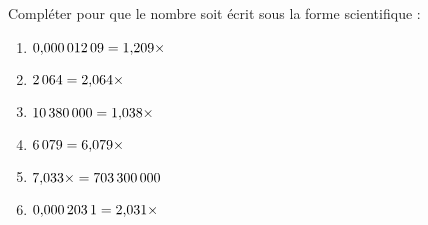 \begin{minipage}{0.99\linewidth}

\exo


Compléter pour que le nombre soit écrit sous la forme scientifique :
 
\begin{multicols}{3}

    \noindent

\begin{enumerate}

    \item $0{,}000\,012\,09=1{,}209\times\dotfill$

    \item $2\,064=2{,}064\times\dotfill$

    \item $10\,380\,000=1{,}038\times\dotfill$

    \item $6\,079=6{,}079\times\dotfill$

    \item $7{,}033\times\dotfill=703\,300\,000$

    \item $0{,}000\,203\,1=2{,}031\times\dotfill$

\end{enumerate}

\end{multicols}

\end{minipage}

\vspace{0.5cm}
